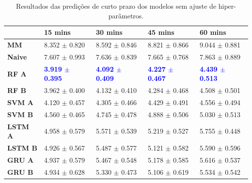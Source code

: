 \begin{table}[H]
    \begin{tabular*}{\linewidth}{@{\extracolsep{\fill}}lllll}
    \toprule
     & 
    \multicolumn{1}{l}{\textbf{15 mins}} & 
    \multicolumn{1}{l}{\textbf{30 mins}} &
    \multicolumn{1}{l}{\textbf{45 mins}} &
    \multicolumn{1}{l}{\textbf{60 mins}} \\
\midrule
\textbf{MM} & 8.352 $\pm$ 0.820 & 8.592 $\pm$ 0.846 & 8.821 $\pm$ 0.866 & 9.044 $\pm$ 0.881
\\

\midrule
\textbf{Naive} & 7.607 $\pm$ 0.993 & 7.636 $\pm$ 0.839 & 7.665 $\pm$ 0.768 & 7.863 $\pm$ 0.889
\\

\midrule
\textbf{RF A} & \textcolor{blue}{\textbf{3.919 $\pm$ 0.395}} & \textcolor{blue}{\textbf{4.092 $\pm$ 0.409}} & \textcolor{blue}{\textbf{4.227 $\pm$ 0.467}} & \textcolor{blue}{\textbf{4.439 $\pm$ 0.513}}
\\

\midrule
\textbf{RF B} & 3.962 $\pm$ 0.400 & 4.132 $\pm$ 0.410 & 4.284 $\pm$ 0.468 & 4.508 $\pm$ 0.501
\\

\midrule
\textbf{SVM A} & 4.120 $\pm$ 0.457 & 4.305 $\pm$ 0.466 & 4.429 $\pm$ 0.491 & 4.556 $\pm$ 0.494
\\

\midrule
\textbf{SVM B} & 4.560 $\pm$ 0.465 & 4.745 $\pm$ 0.478 & 4.888 $\pm$ 0.506 & 5.030 $\pm$ 0.513
\\

\midrule
\textbf{LSTM A} & 4.958 $\pm$ 0.579 & 5.571 $\pm$ 0.539 & 5.219 $\pm$ 0.527 & 5.755 $\pm$ 0.448
\\

\midrule
\textbf{LSTM B} & 4.926 $\pm$ 0.567 & 5.487 $\pm$ 0.577 & 5.121 $\pm$ 0.582 & 5.590 $\pm$ 0.596
\\

\midrule
\textbf{GRU A} & 4.937 $\pm$ 0.579 & 5.467 $\pm$ 0.548 & 5.178 $\pm$ 0.585 & 5.616 $\pm$ 0.537
\\

\midrule
\textbf{GRU B} & 4.934 $\pm$ 0.628 & 5.330 $\pm$ 0.473 & 5.106 $\pm$ 0.619 & 5.534 $\pm$ 0.542
\\
    \bottomrule
    \end{tabular*}
    \label{table:curto_prazo_no_tuning}
    \caption{Resultados das predições de curto prazo dos modelos sem ajuste de hiper-parâmetros.}
\end{table}

